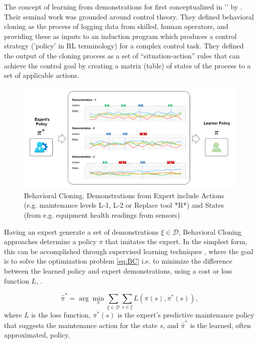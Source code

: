\documentclass{article}
\begin{document}
The concept of learning from demonstrations for first conceptualized in '' by \cite{BC-bain1995}. Their seminal work was grounded around control theory. They defined behavioral cloning as the process of logging data from skilled, human operators, and providing these as inputs to an induction program which produces a control strategy ('policy' in RL terminology) for a complex control task. They defined the output of the cloning process as a set of ``situation-action'' rules that can achieve the control goal by creating a matrix (table) of states of the process to a set of applicable actions.

\begin{figure}[H]
\centering
\includegraphics[width=\linewidth]{images/BC_Diagram.png}
\caption{Behavioral Cloning. Demonstrations from Expert include Actions (e.g. maintenance levels L-1, L-2 or Replace tool *R*) and States (from e.g. equipment health readings from sensors)}
\label{fig:BC}
\end{figure}

Having an expert generate a set of demonstrations $\xi \in \mathcal{D}$, Behavioral Cloning approaches determine a policy $\pi$ that imitates the expert. In the simplest form, this can be accomplished through supervised learning techniques \citep{abbeel2004apprenticeship, yue2018imitation}, where the goal is to solve the optimization problem \eqref{eq:BC} i.e. to minimize the difference between the learned policy and expert demonstrations, using a cost or loss function $L$, \citep{stanford-lectures}.  

\begin{equation}\label{eq:BC}
\hat{\pi}^* = \arg\min_{\pi} \sum_{\xi \in \mathcal{D}} \sum_{s \in \xi} L(\pi(s), \pi^*(s)),
\end{equation}
where $L$ is the loss function, $\pi^*(s)$ is the expert's predictive maintenance policy that suggests the maintenance action for the state $s$, and $\hat{\pi}^*$ is the learned, often approximated, policy.
\end{document}
